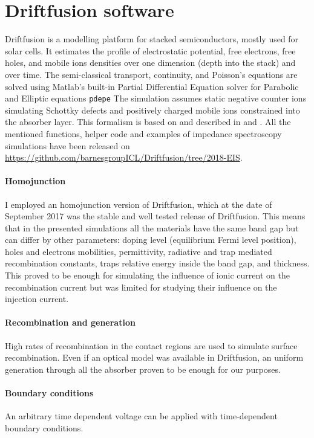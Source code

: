 \section{Driftfusion software}
	Driftfusion is a modelling platform for stacked semiconductors, mostly used for solar cells.
	It estimates the profile of electrostatic potential, free electrons, free holes, and mobile ions densities over one dimension (depth into the stack) and over time.
	The semi-classical transport, continuity, and Poisson's equations are solved using Matlab's built-in Partial Differential Equation solver for Parabolic and Elliptic equations \texttt{pdepe}
	The simulation assumes static negative counter ions simulating Schottky defects \cite{Walsh2015} and positively charged mobile ions constrained into the absorber layer.
	This formalism is based on  and described in  and .
	All the mentioned functions, helper code and examples of impedance spectroscopy simulations have been released on \url{https://github.com/barnesgroupICL/Driftfusion/tree/2018-EIS}.

	\paragraph{Homojunction}
	I employed an homojunction version of Driftfusion, which at the date of September 2017 was the stable and well tested release of Driftfusion.
	This means that in the presented simulations all the materials have the same band gap but can differ by other parameters: doping level (equilibrium Fermi level position), holes and electrons mobilities, permittivity, radiative and trap mediated recombination constants, traps relative energy inside the band gap, and thickness.
	This proved to be enough for simulating the influence of ionic current on the recombination current but was limited for studying their influence on the injection current.

	\paragraph{Recombination and generation}
	High rates of recombination in the contact regions are used to simulate surface recombination.
	Even if an optical model was available in Driftfusion, an uniform generation through all the absorber proven to be enough for our purposes.

	\paragraph{Boundary conditions}
	An arbitrary time dependent voltage can be applied with time\hyp{}dependent boundary conditions.
	
